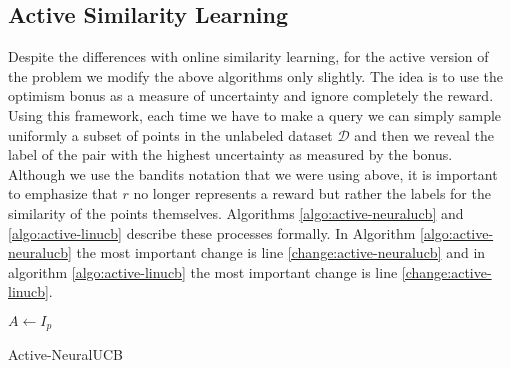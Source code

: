\documentclass{article}
\begin{document}
  \subsection{Active Similarity Learning}
  Despite the differences with online similarity learning, for the active version of the problem we modify the above algorithms only slightly.
  The idea is to use the optimism bonus as a measure of uncertainty and ignore completely the reward.
  Using this framework, each time we have to make a query we can simply sample uniformly a subset of points in the unlabeled dataset $\mathcal{D}$  and then we reveal the label of the pair with the highest uncertainty as measured by the bonus.
  Although we use the bandits notation that we were using above, it is important to emphasize that $r$ no longer represents a reward but rather the labels for the similarity of the points themselves.
  Algorithms \ref{algo:active-neuralucb} and \ref{algo:active-linucb} describe these processes formally.
  In Algorithm \ref{algo:active-neuralucb} the most important change is line \ref{change:active-neuralucb} and in algorithm
  \ref{algo:active-linucb} the most important change is line \ref{change:active-linucb}.
  \begin{algorithm}
  \label{algo:active-neuralucb}
    $A \gets I_{p}$\;
    \caption{Active-NeuralUCB}
  \end{algorithm}
\end{document}
